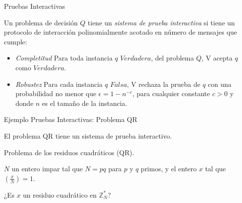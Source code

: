 \documentclass{beamer}
\begin{document}
\begin{frame}{Pruebas Interactivas}
	\begin{definition}
		
		Un problema de decisión $Q$ tiene un \textit{sistema de prueba interactiva} si tiene un protocolo de interacción polinomialmente acotado en número de mensajes que cumple:
		
		\begin{itemize}
			\item \textit{Completitud} Para toda instancia $q$ $Verdadera$, del problema $Q$, V acepta $q$ como $Verdadera$.
			\item \textit{Robustez} Para cada instancia $q$ $Falsa$, V rechaza la prueba de $q$ con una probabilidad no menor que $\epsilon = 1-n^{-c}$, para cualquier constante $c>0$ y donde $n$ es el tamaño de la instancia.
		\end{itemize}
		
	\end{definition}
\end{frame}

\begin{frame}{Ejemplo Pruebas Interactivas: Problema QR}
	\begin{theorem}
		El problema QR tiene un sistema de prueba interactivo.
	\end{theorem}

	\begin{description}[Parámetros]
		\item[Nombre] Problema de los residuos cuadr\'aticos (QR).
		\item[Parámetros] $N$ un entero impar tal que $N = pq$ para $p$ y $q$ primos, y el entero $x$ tal que $\left( \frac{x}{N} \right) = 1$.
		\item[Pregunta] ¿Es $x$ un residuo cuadrático en ${\mathbb Z}_N^*$?
	\end{description}
\end{frame}
\end{document}
